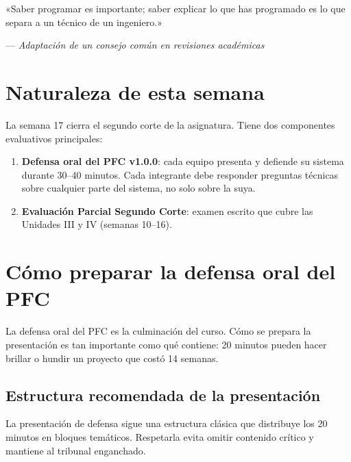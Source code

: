 \epigraph{«Saber programar es importante; saber explicar lo que has
programado es lo que separa a un técnico de un ingeniero.»}{---
\textit{Adaptación de un consejo común en revisiones académicas}}

\section*{Naturaleza de esta semana}
La semana 17 cierra el segundo corte de la asignatura. Tiene dos
componentes evaluativos principales:

\begin{enumerate}
\item \textbf{Defensa oral del PFC v1.0.0}: cada equipo presenta y
defiende su sistema durante 30--40 minutos. Cada integrante debe
responder preguntas técnicas sobre cualquier parte del sistema, no
solo sobre la suya.
\item \textbf{Evaluación Parcial Segundo Corte}: examen escrito que
cubre las Unidades III y IV (semanas 10--16).
\end{enumerate}

\section{Cómo preparar la defensa oral del PFC}

La defensa oral del PFC es la culminación del curso. Cómo
se prepara la presentación es tan importante como qué contiene:
20 minutos pueden hacer brillar o hundir un proyecto que costó 14
semanas.


\subsection{Estructura recomendada de la presentación}

La presentación de defensa sigue una estructura clásica que
distribuye los 20 minutos en bloques temáticos. Respetarla evita
omitir contenido crítico y mantiene al tribunal enganchado.


